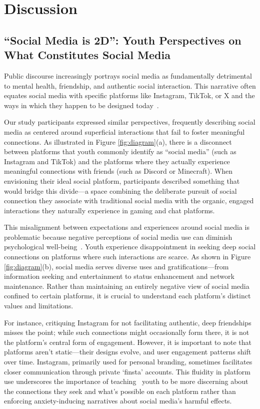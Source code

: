 \section{Discussion}


\subsection{``Social Media is 2D'': Youth Perspectives on What Constitutes Social Media}
Public discourse increasingly portrays social media as fundamentally detrimental to mental health, friendship, and authentic social interaction. This narrative often equates social media with specific platforms like Instagram, TikTok, or X and the ways in which they happen to be designed today~\cite{positech}.

Our study participants expressed similar perspectives, frequently describing social media as centered around superficial interactions that fail to foster meaningful connections. As illustrated in Figure \ref{fig:diagram}(a), there is a disconnect between platforms that youth commonly identify as ``social media'' (such as Instagram and TikTok) and the platforms where they actually experience meaningful connections with friends (such as Discord or Minecraft). When envisioning their ideal social platform, participants described something that would bridge this divide---a space combining the deliberate pursuit of social connection they associate with traditional social media with the organic, engaged interactions they naturally experience in gaming and chat platforms.

This misalignment between expectations and experiences around social media is problematic because negative perceptions of social media use can diminish psychological well-being~\cite{lee2024social, kim2024privacysocialnormsystematically}. Youth experience disappointment in seeking deep social connections on platforms where such interactions are scarce. As shown in Figure \ref{fig:diagram}(b), social media serves diverse uses and gratifications---from information seeking and entertainment to status enhancement and network maintenance. Rather than maintaining an entirely negative view of social media confined to certain platforms, it is crucial to understand each platform's distinct values and limitations.

For instance, critiquing Instagram for not facilitating authentic, deep friendships misses the point; while such connections might occasionally form there, it is not the platform's central form of engagement. However, it is important to note that platforms aren't static---their designs evolve, and user engagement patterns shift over time. Instagram, primarily used for personal branding, sometimes facilitates closer communication through private `finsta' accounts. This fluidity in platform use underscores the importance of teaching~\cite{WilsonWisniewski-2012-FightingMyRegulation-m, Wisniewski-2018-PrivacyParadox-l, TheLearningNetwork-2025-WhatTeensMedia-z} youth to be more discerning about the connections they seek and what's possible on each platform rather than enforcing anxiety-inducing narratives about social media's harmful effects.

